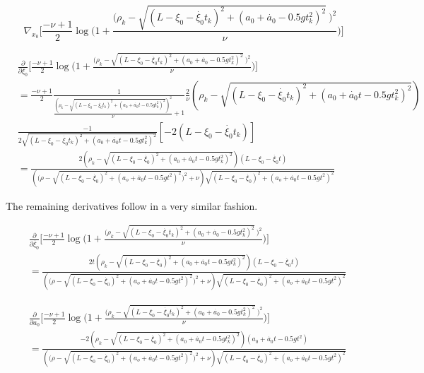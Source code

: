 \documentclass[11pt]{article}
\begin{document}
\begin{enumerate}[label=\alph*)]
\[
\nabla_{x_0}\Bigg[\frac{-\nu+1}{2}\log\Bigg(1+ \frac{\Big(\rho_k - \sqrt{(L-\xi_0 - \dot{\xi_0}t_k)^2 + (a_0 + \dot{a_0} - 0.5gt_k^2)^2} \ \Big)^2}{\nu}\Bigg)\Bigg]
\]


\begin{align*}
    & \frac{\partial}{\partial \xi_0}\Bigg[\frac{-\nu+1}{2}\log\Bigg(1+ \frac{\Big(\rho_k - \sqrt{(L-\xi_0 - \dot{\xi_0}t_k)^2 + (a_0 + \dot{a_0} - 0.5gt_k^2)^2} \ \Big)^2}{\nu}\Bigg)\Bigg] \\
    & = \frac{-\nu + 1}{2} \frac{1}{\frac{(\rho_k - \sqrt{(L-\xi_0 - \dot{\xi_0}t_k)^2 + (a_0 + \dot{a_0}t - 0.5gt_k^2)^2})^2}{\nu} + 1} \frac{2}{\nu} (\rho_k - \sqrt{(L-\xi_0 - \dot{\xi_0}t_k)^2 + (a_0 + \dot{a_0}t - 0.5gt_k^2)^2}) \\
    & \frac{-1}{2\sqrt{(L-\xi_0 - \dot{\xi_0}t_k)^2 + (a_0 + \dot{a_0}t - 0.5gt_k^2)^2}} [-2(L-\xi_0 - \dot{\xi_0}t_k)]\\
    & = \frac{2(\rho_k - \sqrt{(L-\xi_0 - \dot{\xi_0})^2 + (a_0 + \dot{a_0}t - 0.5gt_k^2)^2})(L-\xi_0-\dot{\xi_0}t)}
    {(\Big(\rho - \sqrt{(L-\xi_0-\dot{\xi_0})^2 + (a_o + \dot{a_0}t-0.5gt^2)^2}\Big)^2 + \nu)\sqrt{(L-\xi_0-\dot{\xi_0})^2 + (a_o + \dot{a_0}t-0.5gt^2)^2}} 
\end{align*}

The remaining derivatives follow in a very similar fashion.

\begin{align*}
    &\frac{\partial}{\partial \dot{\xi_0}}\Bigg[\frac{-\nu+1}{2}\log\Bigg(1+ \frac{\Big(\rho_k - \sqrt{(L-\xi_0 - \dot{\xi_0}t_k)^2 + (a_0 + \dot{a_0} - 0.5gt_k^2)^2} \ \Big)^2}{\nu}\Bigg)\Bigg] \\
    &= \frac{2t(\rho_k - \sqrt{(L-\xi_0 - \dot{\xi_0})^2 + (a_0 + \dot{a_0}t - 0.5gt_k^2)^2})(L-\xi_0-\dot{\xi_0}t)}
    {(\Big(\rho - \sqrt{(L-\xi_0-\dot{\xi_0})^2 + (a_o + \dot{a_0}t-0.5gt^2)^2}\Big)^2 + \nu)\sqrt{(L-\xi_0-\dot{\xi_0})^2 + (a_o + \dot{a_0}t-0.5gt^2)^2}} 
\end{align*}

\begin{align*}
    &\frac{\partial}{\partial a_0}\Bigg[\frac{-\nu+1}{2}\log\Bigg(1+ \frac{\Big(\rho_k - \sqrt{(L-\xi_0 - \dot{\xi_0}t_k)^2 + (a_0 + \dot{a_0} - 0.5gt_k^2)^2} \ \Big)^2}{\nu}\Bigg)\Bigg] \\
    &= \frac{-2(\rho_k - \sqrt{(L-\xi_0 - \dot{\xi_0})^2 + (a_0 + \dot{a_0}t - 0.5gt_k^2)^2})(a_0+\dot{a_0}t-0.5gt^2)}
    {(\Big(\rho - \sqrt{(L-\xi_0-\dot{\xi_0})^2 + (a_o + \dot{a_0}t-0.5gt^2)^2}\Big)^2 + \nu)\sqrt{(L-\xi_0-\dot{\xi_0})^2 + (a_o + \dot{a_0}t-0.5gt^2)^2}} 
\end{align*}


\end{enumerate}
\end{document}
